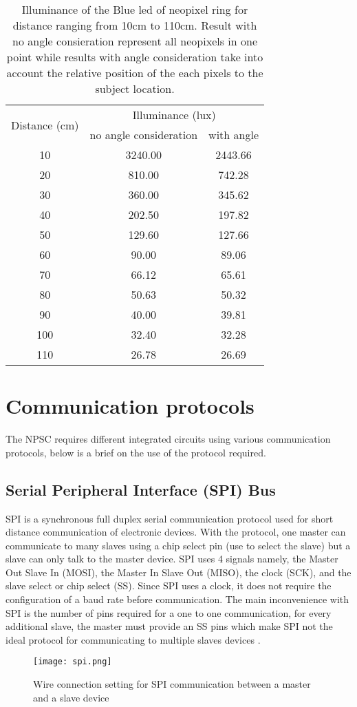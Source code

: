 \begin{table}[h!]
\centering
\caption{Illuminance of the Blue led of neopixel ring for distance ranging from 10cm to 110cm. Result with no angle consieration represent all neopixels in one point while results with angle consideration take into account the relative position of the each pixels to the subject location.}
\label{table:neopixel_illuminance}
\begin{tabular}{ccc}
\hline
\hline
\multirow{2}{*}{Distance (cm)}  & \multicolumn{2}{c}{Illuminance (lux)} \\  
 & no angle consideration & with angle \\
\hline
\hline
10	&	3240.00	&	2443.66	\\
20	&	810.00	&	742.28	\\
30	&	360.00	&	345.62	\\
40	&	202.50	&	197.82	\\
50	&	129.60	&	127.66	\\
60	&	90.00	&	89.06	\\
70	&	66.12	&	65.61	\\
80	&	50.63	&	50.32	\\
90	&	40.00	&	39.81	\\
100	&	32.40	&	32.28	\\
110	&	26.78	&	26.69	\\
\hline
\hline
\end{tabular}
\end{table}
\section{Communication protocols}\label{com_protocols}
The NPSC requires different integrated circuits using various communication protocols, below is a brief on the use of the protocol required.

\subsection{Serial Peripheral Interface (SPI) Bus}
SPI is a synchronous full duplex serial communication protocol used for short distance communication of electronic devices. With the protocol, one master can communicate to many slaves using a chip select pin (use to select the slave) but a slave can only talk to the master device. SPI uses 4 signals namely, the Master Out Slave In (MOSI), the Master In Slave Out (MISO), the clock (SCK), and the slave select or chip select (SS). Since SPI uses a clock, it does not require the configuration of a baud rate before communication. The main inconvenience with SPI is the number of pins required for a one to one communication, for every additional slave, the master must provide an SS pins which make SPI not the ideal protocol for communicating to multiple slaves devices \cite{spi}. 
\begin{figure}[h!]
\centering
\texttt{[image: spi.png]}
\caption{Wire connection setting for SPI communication between a master and a slave device}
\label{fig:spi_coms}
\end{figure}
